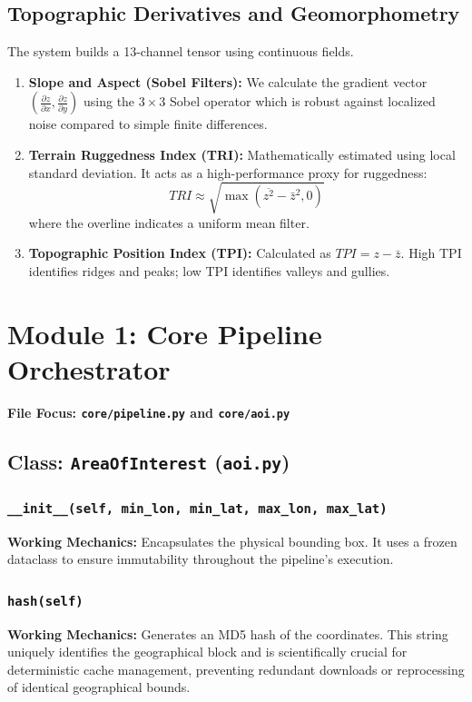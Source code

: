 \documentclass[11pt,a4paper,oneside]{report}
\begin{document}
\section{Topographic Derivatives and Geomorphometry}
The system builds a 13-channel tensor using continuous fields.
\begin{enumerate}
    \item \textbf{Slope and Aspect (Sobel Filters):} We calculate the gradient vector $(\frac{\partial z}{\partial x}, \frac{\partial z}{\partial y})$ using the $3\times3$ Sobel operator which is robust against localized noise compared to simple finite differences.
    \item \textbf{Terrain Ruggedness Index (TRI):} Mathematically estimated using local standard deviation. It acts as a high-performance proxy for ruggedness:
    \begin{equation}
    TRI \approx \sqrt{\max(\overline{z^2} - \bar{z}^2, 0)}
    \end{equation}
    where the overline indicates a uniform mean filter.
    \item \textbf{Topographic Position Index (TPI):} Calculated as $TPI = z - \bar{z}$. High TPI identifies ridges and peaks; low TPI identifies valleys and gullies.
\end{enumerate}

\chapter{Module 1: Core Pipeline Orchestrator}
\textbf{File Focus: \texttt{core/pipeline.py} and \texttt{core/aoi.py}}

\section{Class: \texttt{AreaOfInterest} (\texttt{aoi.py})}
\subsection{\texttt{\_\_init\_\_(self, min\_lon, min\_lat, max\_lon, max\_lat)}}
\textbf{Working Mechanics:} Encapsulates the physical bounding box. It uses a frozen dataclass to ensure immutability throughout the pipeline's execution.
\subsection{\texttt{hash(self)}}
\textbf{Working Mechanics:} Generates an MD5 hash of the coordinates. This string uniquely identifies the geographical block and is scientifically crucial for deterministic cache management, preventing redundant downloads or reprocessing of identical geographical bounds.
\end{document}
